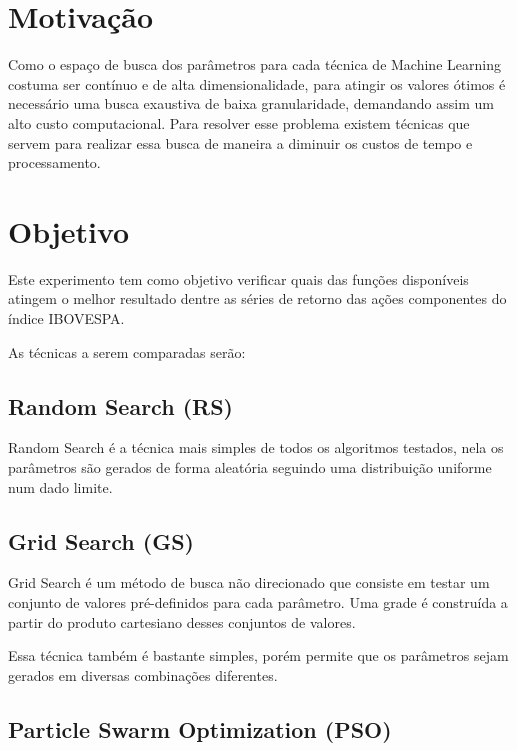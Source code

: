 \documentclass[preprint,12pt]{elsarticle}
\begin{document}

\section{Motivação}
\label{S:1}

Como o espaço de busca dos parâmetros para cada técnica de Machine Learning costuma ser contínuo e de alta dimensionalidade, para atingir os valores ótimos é necessário uma busca exaustiva de baixa granularidade, demandando assim um alto custo computacional.
Para resolver esse problema existem técnicas que servem para realizar essa busca de maneira a diminuir os custos de tempo e processamento.

\section{Objetivo}

Este experimento tem como objetivo verificar quais das funções disponíveis atingem o melhor resultado dentre as séries de retorno das ações componentes do índice IBOVESPA.

As técnicas a serem comparadas serão:

\subsection{Random Search (RS)}

Random Search é a técnica mais simples de todos os algoritmos testados, nela os parâmetros são gerados de forma aleatória seguindo uma distribuição uniforme num dado limite.

\subsection{Grid Search (GS)}

Grid Search é um método de busca não direcionado que consiste em testar um conjunto de valores pré-definidos para cada parâmetro. Uma grade é construída a partir do produto cartesiano desses conjuntos de valores.

Essa técnica também é bastante simples, porém permite que os parâmetros sejam gerados em diversas combinações diferentes.

\subsection{Particle Swarm Optimization (PSO)}
\end{document}
